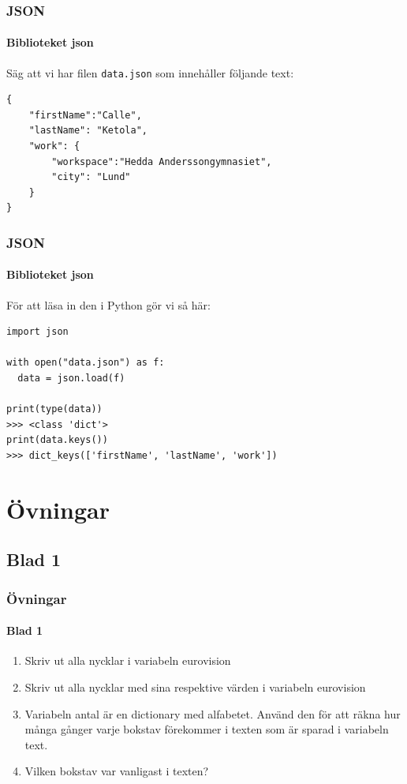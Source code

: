 \documentclass[aspectratio=169]{beamer}
\newcounter{uppgifter}
\begin{document}
\begin{frame}[fragile]
\frametitle{JSON}
\framesubtitle{Biblioteket json}

Säg att vi har filen \texttt{data.json} som innehåller följande text:

\begin{lstlisting}
{
	"firstName":"Calle",
	"lastName": "Ketola",
	"work": {
		"workspace":"Hedda Anderssongymnasiet",
		"city": "Lund"
	}
}
\end{lstlisting}

\end{frame}

\begin{frame}[fragile]
\frametitle{JSON}
\framesubtitle{Biblioteket json}

För att läsa in den i Python gör vi så här:

\begin{lstlisting}
import json

with open("data.json") as f:
  data = json.load(f)

print(type(data))
>>> <class 'dict'>
print(data.keys())
>>> dict_keys(['firstName', 'lastName', 'work'])
\end{lstlisting}

\end{frame}

\section{Övningar}

\subsection{Blad 1}

\begin{frame}
	\frametitle{Övningar}
	\framesubtitle{Blad 1}
	
	\begin{enumerate}
		\item Skriv ut alla nycklar i variabeln eurovision
		\item Skriv ut alla nycklar med sina respektive värden i variabeln eurovision
		\item Variabeln antal är en dictionary med alfabetet. Använd den för att räkna hur många gånger varje bokstav förekommer i texten som är sparad i variabeln text.
		\item Vilken bokstav var vanligast i texten?
		\setcounter{uppgifter}{\value{enumi}}
	\end{enumerate}
	
	
\end{frame}
\end{document}
